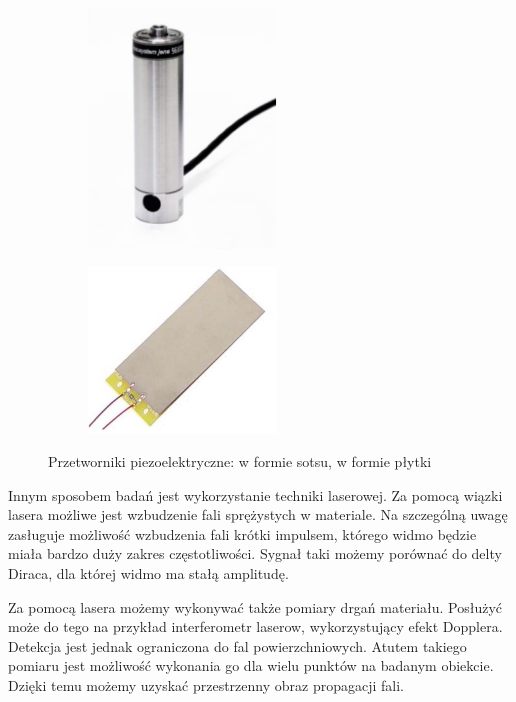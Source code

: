 \begin{figure}[h]
        \centering
        \begin{subfigure}{0.35\textwidth}
                \centering
	     \includegraphics[width=5cm]{Zdjecia/2/piezo_stos}
                \subcaption{\label{subfigure_a}}
        \end{subfigure}
        \begin{subfigure}{0.35\textwidth}
                \centering
	     \includegraphics[width=5cm]{Zdjecia/2/piezo_plytka}
                \subcaption{\label{subfigure_b}}
        \end{subfigure}
        \caption{Przetworniki piezoelektryczne: \protect{} w formie sotsu, \protect{} w formie płytki}
        \label{fig:piezoelektryki}
\end{figure}

\vspace{3mm}

Innym sposobem badań jest wykorzystanie techniki laserowej. Za pomocą wiązki lasera możliwe jest wzbudzenie fali sprężystych w materiale. Na szczególną uwagę zasługuje możliwość wzbudzenia fali krótki impulsem, którego widmo będzie miała bardzo duży zakres częstotliwości. Sygnał taki możemy porównać do delty Diraca, dla której widmo ma stałą amplitudę. 

Za pomocą lasera możemy wykonywać także pomiary drgań materiału. Posłużyć może do tego na przykład interferometr laserow, wykorzystujący efekt Dopplera. Detekcja jest jednak ograniczona do fal powierzchniowych. Atutem takiego pomiaru jest możliwość wykonania go dla wielu punktów na badanym obiekcie. Dzięki temu możemy uzyskać przestrzenny obraz propagacji fali.

